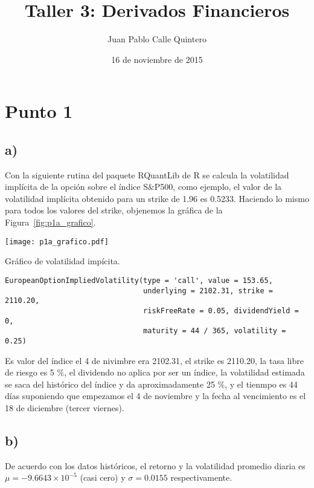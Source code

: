 \documentclass{tufte-handout}
\title{Taller 3: Derivados Financieros}
\author{Juan Pablo Calle Quintero}
\date{16 de noviembre de 2015}
\begin{document}
\maketitle

\section*{Punto 1}

\subsection*{a)}

Con la siguiente rutina del paquete RQuantLib de R se calcula la volatilidad implícita de la opción sobre el índice S\&P500, como ejemplo, el valor de la volatilidad implícita obtenido para un strike de 1.96 es 0.5233. Haciendo lo mismo para todos los valores del strike, objenemos la gráfica de la Figura~\ref{fig:p1a_grafico}.

\begin{marginfigure}
\centering
\texttt{[image: p1a\_grafico.pdf]}
\caption{Gráfico de volatilidad impícita.}
\label{fig:p1a_grafico}
\end{marginfigure}

\begin{verbatim}
EuropeanOptionImpliedVolatility(type = 'call', value = 153.65,
                                underlying = 2102.31, strike = 2110.20,
                                riskFreeRate = 0.05, dividendYield = 0,
                                maturity = 44 / 365, volatility = 0.25)
\end{verbatim}

Es valor del índice el 4 de nivimbre era 2102.31, el strike es 2110.20, la tasa libre de riesgo es 5 \%, el dividendo no aplica por ser un índice, la volatilidad estimada se saca del histórico del índice y da aproximadamente 25 \%, y el tienmpo es 44 días suponiendo que empezamos el 4 de noviembre y la fecha al vencimiento es el 18 de diciembre (tercer viernes).

\subsection*{b)}

De acuerdo con los datos históricos, el retorno y la volatilidad promedio diaria es $\mu = -9.6643\times10^{-5}$ (casi cero) y $\sigma = 0.0155$ respectivamente.
\end{document}
